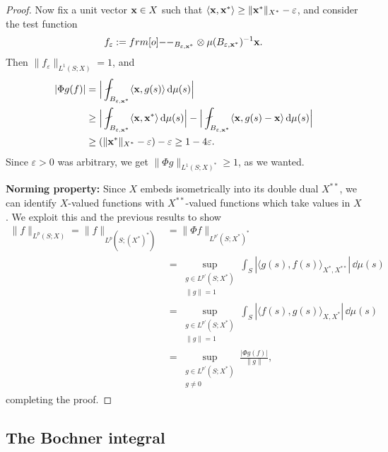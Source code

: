\begin{proof}
  Now fix a unit vector $\mathbf{x} \in X$ such that $\langle \mathbf{x}, \mathbf{x}^* \rangle \geq \|\mathbf{x}^*\|_{X^*} - \varepsilon$, and consider the test function
  \begin{equation*}
    f_{\varepsilon} := \1_{B_{\varepsilon, \mb{x}^*}} \otimes \mu(B_{\varepsilon, \mb{x}^*})^{-1} \mb{x}.
  \end{equation*}
  Then $\|f_{\varepsilon}\|_{L^1(S;X)} = 1$, and
  \begin{equation*}
    \begin{aligned}
      |\Phi g(f)| &=  \Big| \fint_{B_{\varepsilon, \mb{x}^*}} \langle \mb{x}, g(s) \rangle \, \dd\mu(s) \Big| \\
      &\geq \Big| \fint_{B_{\varepsilon, \mb{x}^*}} \langle \mb{x}, \mb{x}^* \rangle \, \dd\mu(s) \Big| - \Big| \fint_{B_{\varepsilon, \mb{x}^*}} \langle \mb{x}, g(s) - \mb{x} \rangle  \, \dd\mu(s) \Big| \\
      &\geq (\|\mb{x}^*\|_{X^*} - \varepsilon) - \varepsilon \geq 1 - 4\varepsilon.
    \end{aligned}
  \end{equation*}
  Since $\varepsilon > 0$ was arbitrary, we get $\|\Phi g\|_{L^1(S;X)^*} \geq 1$, as we wanted.

  \textbf{Norming property:}
  Since $X$ embeds isometrically into its double dual $X^{**}$, we can identify $X$-valued functions with $X^{**}$-valued functions which take values in $X$.
  We exploit this and the previous results to show
  \begin{equation*}
    \begin{aligned}
      \|f\|_{L^p(S;X)} = \|f\|_{L^p(S;(X^*)^*)} &= \|\Phi f\|_{L^{p'}(S; X^*)^*} \\
      &= \sup_{\substack{g \in L^{p'}(S;X^*) \\ \|g\| = 1}} \int_{S} |\langle g(s) , f(s) \rangle_{X^*, X^{**}}| \, \dd\mu(s) \\
      &= \sup_{\substack{g \in L^{p'}(S;X^*) \\ \|g\| = 1}} \int_{S} |\langle f(s) , g(s) \rangle_{X, X^*}| \, \dd\mu(s) \\
      &= \sup_{\substack{g \in L^{p'}(S;X^*) \\ g \neq 0}} \frac{|\Phi g(f)|}{\|g\|},
    \end{aligned}
  \end{equation*}
  completing the proof.
\end{proof}

\subsection{The Bochner integral}

